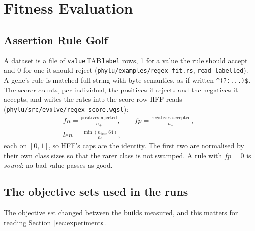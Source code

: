 \documentclass[sigconf,nonacm]{acmart}
\newcommand{\rx}{\lstinline[style=mono]}
\newcommand{\src}[1]{{\small\nolinkurl{#1}}}
\begin{document}
\section{Fitness Evaluation}
\label{sec:fitness}

\subsection{Assertion Rule Golf}

A dataset is a file of \texttt{value}\,TAB\,\texttt{label} rows, 1 for a value the
rule should accept and 0 for one it should reject
(\src{phylu/examples/regex_fit.rs}, \src{read_labelled}). A gene's rule is
matched full-string with byte semantics, as if written \rx!^(?:...)$!. The scorer
counts, per individual, the positives it rejects and the negatives it accepts,
and writes the rates into the score row HFF reads
(\src{phylu/src/evolve/regex_score.wgsl}):
\begin{gather*}
\textit{fn} = \frac{\text{positives rejected}}{n_{+}},\qquad
\textit{fp} = \frac{\text{negatives accepted}}{n_{-}},\\
\textit{len} = \frac{\min(n_{\text{inst}},64)}{64},
\end{gather*}
each on $[0,1]$, so HFF's caps are the identity. The first two are normalised by
their own class sizes so that the rarer class is not swamped. A rule with
$\textit{fp}=0$ is \emph{sound}: no bad value passes as good.

\subsection{The objective sets used in the runs}

The objective set changed between the builds measured, and this matters for
reading Section~\ref{sec:experiments}.
\end{document}

